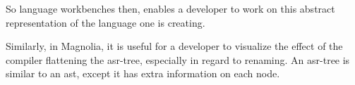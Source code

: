 So language workbenches then, enables a developer to work on this abstract
representation of the language one is creating.

Similarly, in Magnolia, it is useful for a developer to visualize the effect of
the compiler flattening the \gls*{asr}-tree, especially in regard to renaming.
An \gls*{asr}-tree is similar to an \gls*{ast}, except it has extra information
on each node.

